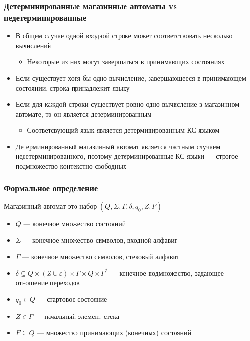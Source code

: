 \documentclass{beamer}
\begin{document}
\begin{frame}[fragile]
  \transwipe[direction=90]
  \frametitle{Детерминированные магазинные автоматы vs недетерминированные}
\begin{itemize}
	\item В общем случае одной входной строке может соответствовать несколько вычислений
	\begin{itemize}
		\item Некоторые из них могут завершаться в принимающих состояниях
	\end{itemize}
	\item Если существует хотя бы одно вычисление, завершающееся в принимающем состоянии, строка принадлежит языку
	\item Если для каждой строки существует ровно одно вычисление в магазинном автомате, то он является детерминированным
	\begin{itemize}
		\item Соответсвующий язык является детерминированным КС языком
	\end{itemize}
	\item Детерминированный магазинный автомат является частным случаем недетерминированного, поэтому детерминированные КС языки --- строгое подмножество контекстно-свободных 
\end{itemize}
\end{frame}

\begin{frame}[fragile]
  \transwipe[direction=90]
  \frametitle{Формальное определение}
  Магазинный автомат это набор $(Q, \Sigma, \Gamma, \delta, q_0, Z, F)$
  \begin{itemize}
    \item $Q$ --- конечное множество состояний
    \item $\Sigma$ --- конечное множество символов, входной алфавит
    \item $\Gamma$ --- конечное множество символов, стековый алфавит
    \item $\delta \subseteq Q \times (Z \cup \varepsilon) \times \Gamma \times Q \times \Gamma^*$ --- конечное  подмножество, задающее отношение переходов
    \item $q_0 \in Q$ --- стартовое состояние
    \item $Z \in \Gamma$ --- начальный элемент стека
    \item $F \subseteq Q$ --- множество принимающих (конечных) состояний
  \end{itemize}
\end{frame}
\end{document}
